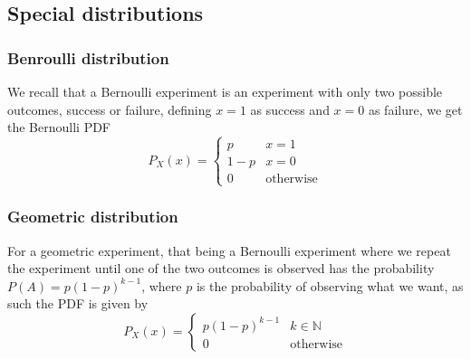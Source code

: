 \subsection{Special distributions}
\subsubsection{Benroulli distribution}
We recall that a Bernoulli experiment is an experiment with only two possible outcomes, success or failure, defining $x=1$ as success and $x=0$ as failure, we get the Bernoulli PDF
\[
    P_{X}(x)=\begin{cases}p & x=1 \\ 1-p & x=0 \\ 0 & \text{otherwise}\end{cases}
\]
\subsubsection{Geometric distribution}
For a geometric experiment, that being a Bernoulli experiment where we repeat the experiment until one of the two outcomes is observed has the probability $P(A)=p(1-p)^{k-1}$, where $p$ is the probability of observing what we want, as such the PDF is given by
\[
    P_{X}(x)=\begin{cases}p(1-p)^{k-1} & k\in \mathbb{N} \\ 0 & \text{otherwise}\end{cases}
\]
